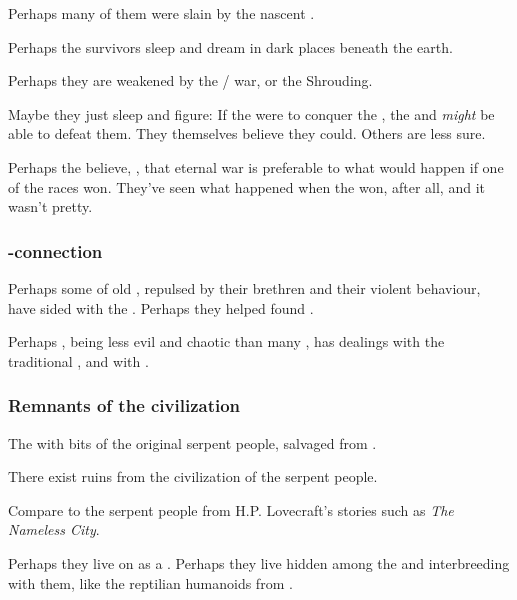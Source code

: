 Perhaps many of them were slain by the nascent \draecchonosh. 

Perhaps the survivors sleep and dream in dark places beneath the earth. 

Perhaps they are weakened by the \dragon/\bane{} war, or the Shrouding. 

Maybe they just sleep and figure: 
If the \banes{} were to conquer the \dragons, the \ophidians{} and \nagae{} \emph{might} be able to defeat them. 
They themselves believe they could. 
Others are less sure. 

Perhaps the \ophidians{} believe, , that eternal war is preferable to what would happen if one of the races won. 
They've seen what happened when the \draecchonosh{} won, after all, and it wasn't pretty.





\subsubsection{\Ophidian-\resphan connection}
Perhaps some of old \ophidians, repulsed by their \draconic{} brethren and their violent behaviour, have sided with the \resphain. Perhaps they helped found \Mystraacht. 

Perhaps \Ishnaruchaefir, being less evil and chaotic than many \dragons, has dealings with the traditional \ophidians{}, and with \Mystraacht.  





\subsubsection{Remnants of the \ophidian{} civilization}
The \scathae{}  with bits of the original serpent people, salvaged from . 

There exist ruins from the civilization of the serpent people. 

Compare to the serpent people from H.P. Lovecraft's stories such as \emph{The Nameless City}.

Perhaps they live on as a . Perhaps they live hidden among the \scathae{} and interbreeding with them, like the reptilian humanoids from \DIBiggestSecret. 





